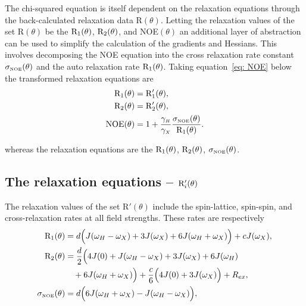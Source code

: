 The chi-squared equation is itself dependent on the relaxation equations through the back-calculated relaxation data R$(\theta)$.
Letting the relaxation values of the set R$(\theta)$ be the $\mathrm{R}_1(\theta)$, $\mathrm{R}_2(\theta)$, and NOE$(\theta)$ an additional layer of abstraction can be used to simplify the calculation of the gradients and Hessians.
This involves decomposing the NOE equation into the cross relaxation rate constant $\sigma_{\scriptscriptstyle \mathrm{NOE}}(\theta)$ and the auto relaxation rate $\mathrm{R}_1(\theta)$.
Taking equation~\eqref{eq: NOE} below the transformed relaxation equations are
\begin{subequations}
\begin{align}
    \mathrm{R}_1(\theta) &= \mathrm{R}_1'(\theta), \\
    \mathrm{R}_2(\theta) &= \mathrm{R}_2'(\theta), \\
    \mathrm{NOE}(\theta)  &= 1 + \frac{\gamma_{\scriptscriptstyle H}}{\gamma_{\scriptscriptstyle X}} \frac{\sigma_{\scriptscriptstyle \mathrm{NOE}}(\theta)}{\mathrm{R}_1(\theta)}.
\end{align}
\end{subequations}

\noindent whereas the relaxation equations are the $\mathrm{R}_1(\theta)$, $\mathrm{R}_2(\theta)$, $\sigma_{\scriptscriptstyle \mathrm{NOE}}(\theta)$.



\subsection{The relaxation equations -- $\mathrm{R}_i'(\theta)$}

The relaxation values of the set R$'(\theta)$ include the spin-lattice, spin-spin, and cross-relaxation rates at all field strengths.
These rates are respectively \citep{Abragam61}
\begin{subequations}
\begin{align}
    \mathrm{R}_1(\theta) &= d \Big( J(\omega_H - \omega_X) + 3J(\omega_X) + 6J(\omega_H + \omega_X) \Big) + cJ(\omega_X),     \label{eq: R1} \\
    \mathrm{R}_2(\theta) &= \frac{d}{2} \Big( 4J(0) + J(\omega_H - \omega_X) + 3J(\omega_X) + 6J(\omega_H)                    \nonumber \\
        & \quad + 6J(\omega_H + \omega_X) \Big) + \frac{c}{6} \Big( 4J(0) + 3J(\omega_X) \Big) + R_{ex},              \label{eq: R2} \\  
    \sigma_{\scriptscriptstyle \mathrm{NOE}}(\theta) &= d \Big( 6J(\omega_H + \omega_X) - J(\omega_H - \omega_X) \Big),                              \label{eq: sigma_NOE}
\end{align}
\end{subequations}

